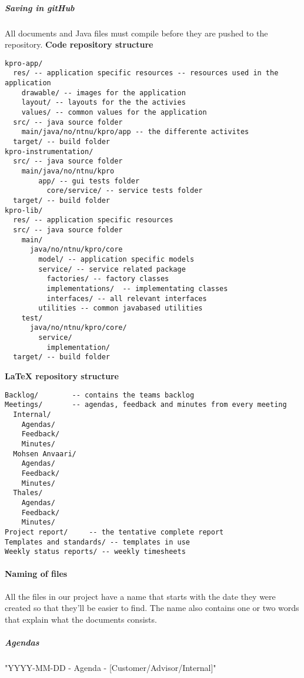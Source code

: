 \subparagraph{Saving in gitHub}\hfill
\newline
All documents and Java files must compile before they are pushed to the repository.
\newline
\newline
\textbf{Code repository structure}
\begin{verbatim}
kpro-app/
  res/ -- application specific resources -- resources used in the application
    drawable/ -- images for the application
    layout/ -- layouts for the the activies
    values/ -- common values for the application
  src/ -- java source folder
    main/java/no/ntnu/kpro/app -- the differente activites
  target/ -- build folder
kpro-instrumentation/
  src/ -- java source folder
    main/java/no/ntnu/kpro
	    app/ -- gui tests folder
		  core/service/ -- service tests folder
  target/ -- build folder
kpro-lib/
  res/ -- application specific resources
  src/ -- java source folder
    main/
      java/no/ntnu/kpro/core
        model/ -- application specific models
        service/ -- service related package
          factories/ -- factory classes
          implementations/  -- implementating classes
          interfaces/ -- all relevant interfaces
        utilities -- common javabased utilities
    test/
      java/no/ntnu/kpro/core/
        service/
          implementation/
  target/ -- build folder

\end{verbatim}
\textbf{LaTeX repository structure}
\begin{verbatim}
Backlog/		-- contains the teams backlog
Meetings/		-- agendas, feedback and minutes from every meeting
  Internal/
    Agendas/
    Feedback/
    Minutes/
  Mohsen Anvaari/
    Agendas/
    Feedback/
    Minutes/
  Thales/
    Agendas/
    Feedback/
    Minutes/
Project report/		-- the tentative complete report
Templates and standards/ -- templates in use
Weekly status reports/ -- weekly timesheets

\end{verbatim}

\paragraph{Naming of files}\hfill
\newline
All the files in our project have a name that starts with the date they were created so that they’ll be easier to find. The name also contains one or two words that explain what the documents consists.

\subparagraph{Agendas}\hfill
\newline
"YYYY-MM-DD - Agenda - [Customer/Advisor/Internal]"

